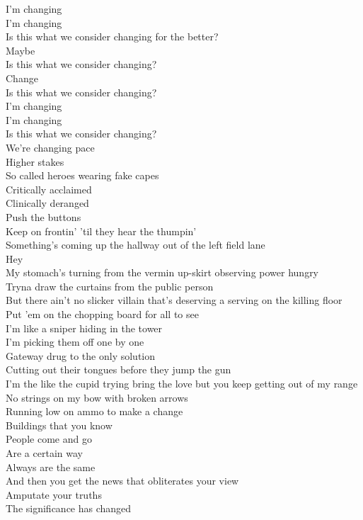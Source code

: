 I'm changing \\
I'm changing \\
Is this what we consider changing for the better? \\
Maybe \\
Is this what we consider changing? \\
Change \\

Is this what we consider changing? \\
I'm changing \\
I'm changing \\
Is this what we consider changing? \\

We're changing pace \\
Higher stakes \\
So called heroes wearing fake capes \\
Critically acclaimed \\
Clinically deranged \\
Push the buttons \\
Keep on frontin' 'til they hear the thumpin' \\
Something's coming up the hallway out of the left field lane \\
Hey \\
My stomach's turning from the vermin up-skirt observing power hungry \\
Tryna draw the curtains from the public person \\
But there ain't no slicker villain that's deserving a serving on the killing floor \\
Put 'em on the chopping board for all to see \\

I'm like a sniper hiding in the tower \\
I'm picking them off one by one \\
Gateway drug to the only solution \\
Cutting out their tongues before they jump the gun \\
I'm the like the cupid trying bring the love but you keep getting out of my range \\
No strings on my bow with broken arrows \\
Running low on ammo to make a change \\

Buildings that you know \\
People come and go \\
Are a certain way \\
Always are the same \\
And then you get the news that obliterates your view \\
Amputate your truths \\
The significance has changed \\

